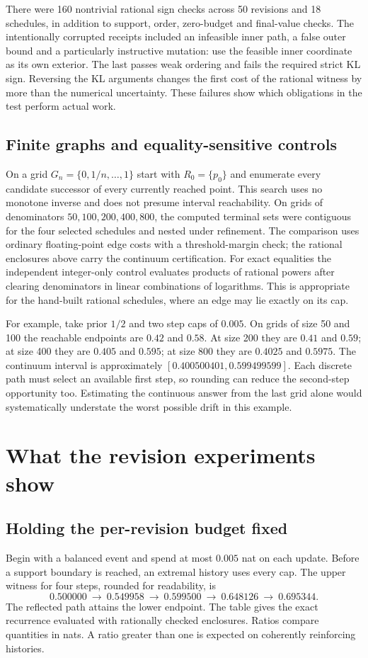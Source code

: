 \documentclass[12pt,letterpaper]{article}
\begin{document}
There were 160 nontrivial rational sign checks across 50 revisions and 18 schedules, in addition to support, order, zero-budget and final-value checks. The intentionally corrupted receipts included an infeasible inner path, a false outer bound and a particularly instructive mutation: use the feasible inner coordinate as its own exterior. The last passes weak ordering and fails the required strict KL sign. Reversing the KL arguments changes the first cost of the rational witness by more than the numerical uncertainty. These failures show which obligations in the test perform actual work.

\subsection{Finite graphs and equality-sensitive controls}
On a grid \(G_n=\{0,1/n,\ldots,1\}\) start with \(R_0=\{p_0\}\) and enumerate every candidate successor of every currently reached point. This search uses no monotone inverse and does not presume interval reachability. On grids of denominators \(50,100,200,400,800\), the computed terminal sets were contiguous for the four selected schedules and nested under refinement. The comparison uses ordinary floating-point edge costs with a threshold-margin check; the rational enclosures above carry the continuum certification. For exact equalities the independent integer-only control evaluates products of rational powers after clearing denominators in linear combinations of logarithms. This is appropriate for the hand-built rational schedules, where an edge may lie exactly on its cap.

For example, take prior \(1/2\) and two step caps of \(0.005\). On grids of size 50 and 100 the reachable endpoints are \(0.42\) and \(0.58\). At size 200 they are \(0.41\) and \(0.59\); at size 400 they are \(0.405\) and \(0.595\); at size 800 they are \(0.4025\) and \(0.5975\). The continuum interval is approximately \([0.400500401,0.599499599]\). Each discrete path must select an available first step, so rounding can reduce the second-step opportunity too. Estimating the continuous answer from the last grid alone would systematically understate the worst possible drift in this example.

\section{What the revision experiments show}
\subsection{Holding the per-revision budget fixed}
Begin with a balanced event and spend at most \(0.005\) nat on each update. Before a support boundary is reached, an extremal history uses every cap. The upper witness for four steps, rounded for readability, is
\[
   0.500000\ \longrightarrow\ 0.549958\ \longrightarrow\
   0.599500\ \longrightarrow\ 0.648126\ \longrightarrow\ 0.695344 .
\]
The reflected path attains the lower endpoint. The table gives the exact recurrence evaluated with rationally checked enclosures. Ratios compare quantities in nats. A ratio greater than one is expected on coherently reinforcing histories.
\end{document}

